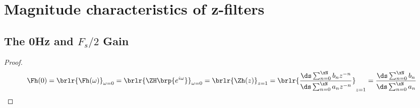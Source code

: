 
\chapter{Magnitude characteristics of z-filters}
\section{The 0Hz and $F_s/2$ Gain}
\begin{proposition}
\end{proposition}
\begin{proof}
%
\begin{align*}\
  \Fh(0) 
     = \brlr{\Fh(\omega)}_{\omega=0}
     = \brlr{\ZH\brp{e^{i\omega}}}_{\omega=0}
     = \brlr{\Zh(z)}_{z=1}
     = \brlr{\frac{\ds\sum_{n=0}^{\xN}b_n z^{-n}}
            {\ds\sum_{n=0}^{\xN}a_n z^{-n}}}_{z=1}
     = \frac{\ds\sum_{n=0}^{\xN}b_n }
            {\ds\sum_{n=0}^{\xN}a_n }
\end{align*}
\end{proof}

